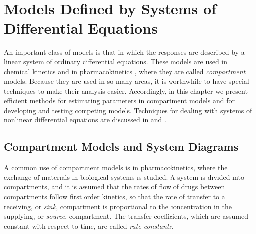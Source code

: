 \chapter[Differential Equations]{Models Defined by Systems
of Differential Equations}


An important class of models is that in which the responses are
described by a linear system of ordinary differential
equations.
These models are used in chemical kinetics
\cite{from:bisc:1979} and in pharmacokinetics
\cite{godf:1983},
where they are called {\em compartment\/} models.
Because they are used in so many areas, it is worthwhile to have
special techniques to make their analysis easier.
Accordingly, in this chapter we present efficient methods for
estimating parameters in compartment models and for developing
and testing competing models.
Techniques for dealing with systems of nonlinear differential
equations are discussed in  and
.

\section{Compartment Models and System Diagrams}

A common use of compartment models is in pharmacokinetics,
where the exchange of materials
in biological systems is studied.
A system is divided into compartments, and
it is assumed that the rates of flow of drugs between
compartments follow first order kinetics, so that the rate of
transfer to a receiving, or {\em sink}, compartment is proportional
to the concentration in the supplying, or {\em source}, compartment.
The transfer coefficients, which are assumed constant with respect to
time, are called {\em rate constants}.

